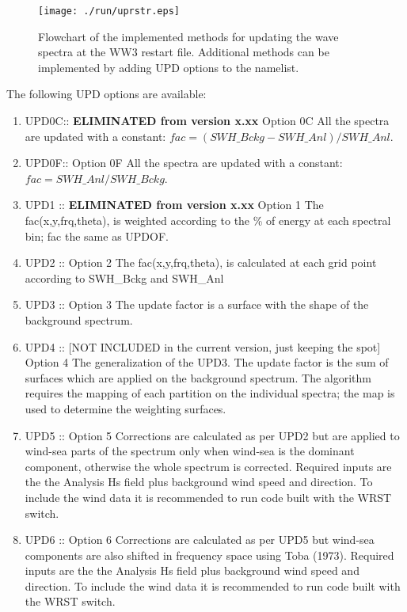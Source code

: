 \begin{figure} \begin{center}
\texttt{[image: ./run/uprstr.eps]}
\caption{Flowchart of the implemented methods for updating the wave spectra at the WW3 
restart file. Additional methods can be implemented by adding UPD options to the namelist.}
\label{fig:uprstrflowchart} \botline
\end{center}
\end{figure}

The following UPD options are available:
\begin{enumerate} 
   \item UPD0C:: \textbf{ELIMINATED from version x.xx} Option 0C  All the spectra are 
   updated with a constant: \newline
      \(fac=(SWH\_Bckg-SWH\_Anl)/SWH\_Anl \).
   \item UPD0F:: Option 0F  All the spectra are updated with a constant: \newline 
      \(fac=SWH\_Anl/SWH\_Bckg \).
   \item UPD1 ::  \textbf{ELIMINATED from version x.xx} Option 1  The fac(x,y,frq,theta), 
   is weighted according to the \% of energy at each spectral bin; fac the same as UPDOF.
   \item UPD2 :: Option 2   The fac(x,y,frq,theta), is calculated at each grid point 
   according to SWH\_Bckg and SWH\_Anl
   \item UPD3 :: Option 3   The update factor is a surface with the shape of 
   the background spectrum. 
   \item UPD4 :: [NOT INCLUDED in the current version, just keeping the spot]
   Option 4  The generalization of the UPD3. The update factor is the sum of surfaces 
   which are applied on the background spectrum. The algorithm requires the mapping 
   of each partition on the individual spectra; the map is used to determine the weighting 
   surfaces.
   \item UPD5 :: Option 5   Corrections are calculated as per UPD2 but are
   applied to wind-sea parts of the spectrum only when wind-sea
   is the dominant component, otherwise the whole spectrum is
   corrected. Required inputs are the the Analysis Hs field plus 
   background wind speed and direction. To include the wind data it is recommended
   to run code built with the WRST switch.
   \item UPD6 :: Option 6   Corrections are calculated as per UPD5 but wind-sea
   components are also shifted in frequency space using Toba (1973).
   Required inputs are the the Analysis Hs field plus background wind speed and direction.
   To include the wind data it is recommended to run code built with the WRST switch.
\end{enumerate}

